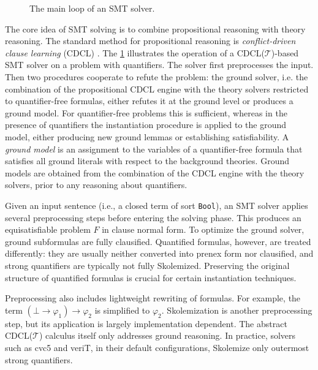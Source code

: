 \begin{figure}
\caption{The main loop of an SMT solver.}
\label{fig:CDCL}
\end{figure}

The core idea of SMT solving is to combine propositional reasoning with theory reasoning.
The standard method for propositional reasoning is \emph{conflict-driven clause learning} (CDCL) \cite{dpll}.
The \cref{fig:CDCL} illustrates the operation of a CDCL($\mathcal{T}$)-based SMT solver on a problem with quantifiers.
The solver first preprocesses the input.
Then two procedures cooperate to refute the problem: the ground solver, i.e. the combination of the propositional CDCL engine with the theory solvers restricted to quantifier-free formulas, either refutes it at the ground level or produces a ground model.
For quantifier-free problems this is sufficient, whereas in the presence of quantifiers the instantiation procedure is applied to the ground model, either producing new ground lemmas or establishing satisfiability.
A \emph{ground model} is an assignment to the variables of a quantifier-free formula that satisfies all ground literals with respect to the background theories.
Ground models are obtained from the combination of the CDCL engine with the theory solvers, prior to any reasoning about quantifiers.

Given an input sentence (i.e., a closed term of sort \texttt{Bool}), an SMT solver applies several preprocessing steps before entering the solving phase.
This produces an equisatisfiable problem $F$ in clause normal form.
To optimize the ground solver, ground subformulas are fully clausified.
Quantified formulas, however, are treated differently: they are usually neither converted into prenex form nor clausified, and strong quantifiers \cite{BAAZ2001273} are typically not fully Skolemized.
Preserving the original structure of quantified formulas is crucial for certain instantiation techniques.

Preprocessing also includes lightweight rewriting of formulas.
For example, the term $(\bot \to \varphi_1) \to \varphi_2$ is simplified to $\varphi_2$.
Skolemization is another preprocessing step, but its application is largely implementation dependent.
The abstract CDCL($\mathcal{T}$) calculus itself only addresses ground reasoning.
In practice, solvers such as cvc5 and veriT, in their default configurations, Skolemize only outermost strong quantifiers.


